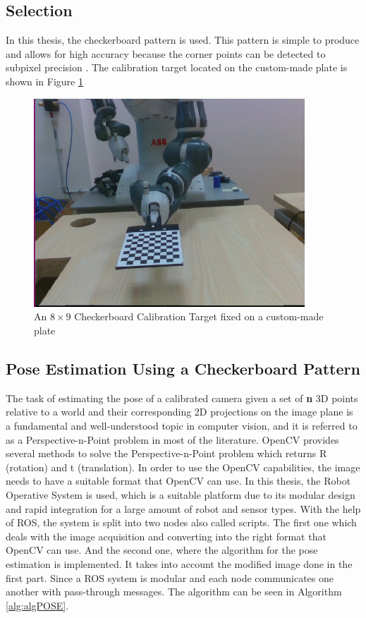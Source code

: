 \subsection{Selection}
In this thesis, the checkerboard pattern is used.  This pattern is simple to produce and allows for high accuracy because the corner points can be detected to subpixel precision \cite{planarTargets}. The calibration target located on the custom-made plate is shown in Figure \ref{fig:target2}


\begin{figure}[!h]
\begin{center}
\includegraphics[width=4in]{figures03/target1.png}
\caption{An $8\times9$ Checkerboard Calibration Target fixed on a custom-made plate}
\label{fig:target2}
\end{center}
\end{figure}

\subsection{Pose Estimation Using a Checkerboard Pattern}\label{pose1}

The task of estimating the pose of a calibrated camera given a set of \textbf{n} 3D points relative to a world and their corresponding 2D projections on the image plane is a fundamental and well-understood topic in computer vision, and it is referred to as a Perspective-n-Point problem in most of the literature. OpenCV provides several methods to solve the Perspective-n-Point problem which returns R (rotation) and t (translation). In order to use the OpenCV capabilities, the image needs to have a suitable format that OpenCV can use. In this thesis, the Robot Operative System is used, which is a suitable platform due to its modular design and rapid integration for a large amount of robot and sensor types.
With the help of ROS, the system is split into two nodes also called scripts. The first one which deals with the image acquisition and converting into the right format that OpenCV can use. And the second one, where the algorithm for the pose estimation is implemented. It takes into account the modified image done in the first part. 
Since a ROS system is modular and each node communicates one another with pass-through messages. The algorithm can be seen in Algorithm \ref{alg:algPOSE}.

